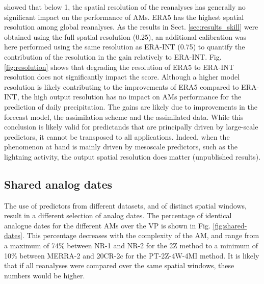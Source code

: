 \documentclass[alpha-refs]{wiley-article}
\begin{document}
\citet{Horton2018b} showed that below 1\degree, the spatial resolution of the reanalyses has generally no significant impact on the performance of AMs. ERA5 has the highest spatial resolution among global reanalyses. As the results in Sect. \ref{sec:results_skill} were obtained using the full spatial resolution (0.25\degree), an additional calibration was here performed using the same resolution as ERA-INT (0.75\degree) to quantify the contribution of the resolution in the gain relatively to ERA-INT. Fig. \ref{fig:resolution} shows that degrading the resolution of ERA5 to ERA-INT resolution does not significantly impact the score. Although a higher model resolution is likely contributing to the improvements of ERA5 compared to ERA-INT, the high output resolution has no impact on AMs performance for the prediction of daily precipitation. The gains are likely due to improvements in the forecast model, the assimilation scheme and the assimilated data. While this conclusion is likely valid for predictands that are principally driven by large-scale predictors, it cannot be transposed to all applications. Indeed, when the phenomenon at hand is mainly driven by mesoscale predictors, such as the lightning activity, the output spatial resolution does matter (unpublished results).


\subsection{Shared analog dates}
\label{sec:results_shared_dates}

The use of predictors from different datasets, and of distinct spatial windows, result in a different selection of analog dates. The percentage of identical analogue dates for the different AMs over the VP is shown in Fig. \ref{fig:shared-dates}. This percentage decreases with the complexity of the AM, and range from a maximum of 74\% between NR-1 and NR-2 for the 2Z method to a minimum of 10\% between MERRA-2 and 20CR-2c for the PT-2Z-4W-4MI method. It is likely that if all reanalyses were compared over the same spatial windows, these numbers would be higher.
\end{document}
